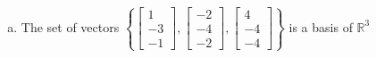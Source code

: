 \begin{exerciseAnswer}
\begin{enumerate}[(a)]
\item The set of vectors \( \left\{ \left[\begin{array}{c}
1 \\
-3 \\
-1
\end{array}\right] , \left[\begin{array}{c}
-2 \\
-4 \\
-2
\end{array}\right] , \left[\begin{array}{c}
4 \\
-4 \\
-4
\end{array}\right] \right\} \) is a basis of \(\mathbb{R}^3\)
\end{enumerate}
    
\end{exerciseAnswer}
    
